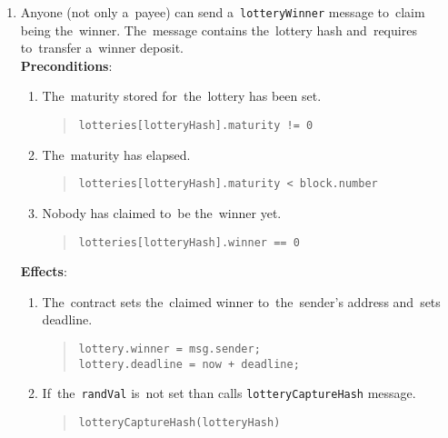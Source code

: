 \documentclass[a4paper]{article}
\begin{document}
\begin{enumerate}
        \item Anyone (not only a~payee) can send a~\texttt{lotteryWinner} message to~claim being the~winner.
            The~message contains the~lottery hash and~requires to~transfer a~winner deposit.\\
            \textbf{Preconditions}:
            \begin{enumerate}
            \item The~maturity stored for~the~lottery has been set.
              \begin{quote}
                \verb|lotteries[lotteryHash].maturity != 0|
              \end{quote}
            \item The~maturity has elapsed.
              \begin{quote}
		\verb|lotteries[lotteryHash].maturity < block.number|
	      \end{quote}
            \item Nobody has claimed to~be the~winner yet.
              \begin{quote}
                \verb|lotteries[lotteryHash].winner == 0|
              \end{quote}
            \end{enumerate}
            \textbf{Effects}:
            \begin{enumerate}
            \item The~contract sets the~claimed winner to~the~sender's address and~sets deadline.
              \begin{quote}
                \verb|lottery.winner = msg.sender;|\\
                \verb|lottery.deadline = now + deadline;|
              \end{quote}
            \item If~the~\texttt{randVal} is~not set than calls \texttt{lotteryCaptureHash} message.
              \begin{quote}
                \verb|lotteryCaptureHash(lotteryHash)|
              \end{quote}
            \end{enumerate}
            

\end{enumerate}
\end{document}
